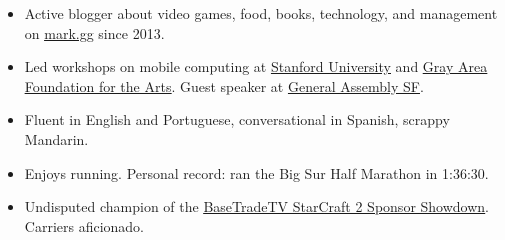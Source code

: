 

\begin{cvparagraph}


\begin{justify}
\begin{itemize}[leftmargin=2ex, nosep]
    \setlength{\parskip}{0pt}
    \setlength\itemsep{0.15em}
    \renewcommand{\labelitemi}{\bullet}
    
    	\item Active blogger about video games, food, books, technology, and management on \href{mark.gg}{\underline{mark.gg}} since 2013.
    \item Led workshops on mobile computing at \href{https://ccrma.stanford.edu/workshops/music-and-mobile-computing}{\underline{Stanford University}} and \href{http://main.dev.gaffta.org/?author=81}{\underline{Gray Area Foundation for the Arts}}. Guest speaker at \href{https://generalassemb.ly/instructors/mark-cerqueira/10476}{\underline{General Assembly SF}}.
    	\item Fluent in English and Portuguese, conversational in Spanish, scrappy Mandarin.
	\item Enjoys running. Personal record: ran the Big Sur Half Marathon in 1:36:30.
	\item Undisputed champion of the \href{http://www.teamliquid.net/forum/sc2-tournaments/529105-basetradetv-sponsor-showdown}{\underline {BaseTradeTV StarCraft 2 Sponsor Showdown}}. Carriers aficionado.

	

\end{itemize}
\end{justify}

\end{cvparagraph}
